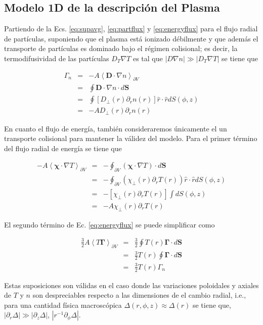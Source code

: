 \subsection{Modelo 1D de la descripción del Plasma}

Partiendo de la Ecs. \eqref{eq:supavg}, \eqref{eq:partflux} y \eqref{eq:energyflux} para el flujo radial de part\'iculas, suponiendo que el plasma está ionizado débilmente y que además el transporte de partículas es dominado bajo el régimen colisional; es decir, la termodifusividad de las partículas $D_T\nabla T$ es tal que $|D\nabla n| \gg |D_T\nabla T|$ se tiene que

\begin{eqnarray}
  \Gamma_n &=& -A\left<\textbf{D}\cdot\nabla n\right>_{\partial V} \\
           &=& \oint \textbf{D}\cdot\nabla n\cdot d\textbf{S}\\
           &=& \oint [D_\perp(r)\partial_r n(r)]\hat{r}\cdot\hat{r}dS(\phi,z) \\
           &=& -AD_\perp(r)\partial_r n(r) 
\end{eqnarray}


En cuanto el flujo de energía, también consideraremos únicamente el un transporte colisional para mantener la válidez del modelo. Para el primer término del flujo radial de energía se tiene que 

\begin{eqnarray}
  -A\left<\pmb{\chi}\cdot\nabla T\right>_{\partial V} &=& - \oint_{\partial V} (\pmb{\chi}\cdot\nabla T)\cdot d\textbf{S} \\
           &=& -\oint_{\partial V} (\chi_\perp(r) \partial_r T(r))\hat{r}\cdot\hat{r}dS(\phi,z)\\
           &=& -[\chi_\perp(r)\partial_rT(r)]\int dS(\phi,z)\\
           &=& -A\chi_\perp(r)\partial_rT(r)
\end{eqnarray}

El segundo término de Ec. \eqref{eq:energyflux} se puede simplificar como

\begin{eqnarray}
  \frac{3}{2}A\left<T\pmb{\Gamma}\right>_{\partial V} &=& \frac{3}{2}\oint T(r)\pmb{\Gamma}\cdot d\textbf{S} \\
                                                      &=& \frac{3}{2}T(r)\oint \pmb{\Gamma}\cdot d\textbf{S}\\
                                                      &=& \frac{3}{2}T(r)\Gamma_n
\end{eqnarray}

Estas suposiciones son válidas en el caso donde las variaciones poloidales y axiales de $T$ y $n$ son despreciables respecto a las dimensiones de el cambio radial, i.e., para una cantidad física macroscópica $\Delta(r,\phi, z) \approx \Delta(r)$ se tiene que, $|\partial_r \Delta| \gg |\partial_z\Delta|$, $|r^{-1}\partial_\phi\Delta|$.
